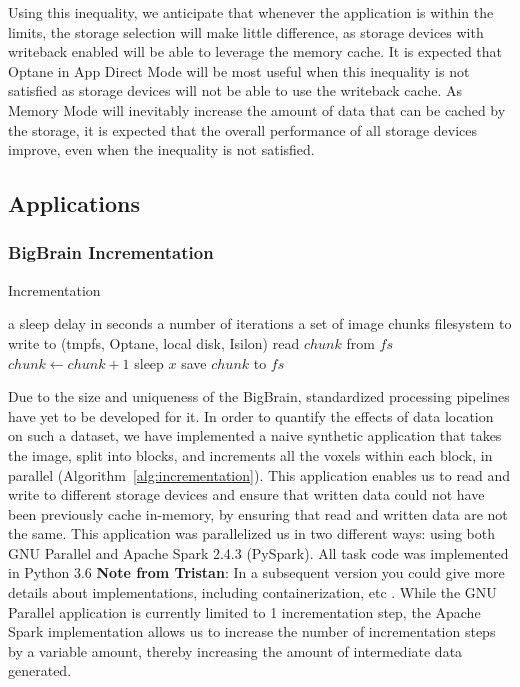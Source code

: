 \documentclass[conference]{IEEEtran}
\newcommand{\Desc}[2]{\State \makebox[2em][l]{#1}#2}
\newcommand{\bigbrain}{BigBrain\xspace}
\newcommand{\tristan}[1]{\color{orange}\textbf{Note from Tristan}:
      #1 \color{black}}
\begin{document}
Using this inequality, we anticipate that whenever the application is within the limits,
the storage selection will make little difference, as storage devices with writeback enabled 
will be able to leverage the memory cache. It is expected that Optane in App Direct Mode
will be most useful when this inequality is not satisfied as storage devices will
not be able to use the writeback cache. As Memory Mode will inevitably
increase the amount of data that can be cached by the storage, it is expected that the overall
performance of all storage devices improve, even when the inequality is not satisfied.

\subsection{Applications}
\subsubsection{ \bigbrain Incrementation}

\begin{algorithm}\caption{Incrementation}\label{alg:incrementation}
    \begin{algorithmic}[1]
    \Input
        \Desc{$x$}{a sleep delay in seconds}
        \Desc{$n$}{a number of iterations}
        \Desc{$C$}{a set of image chunks}
        \Desc{$fs$}{filesystem to write to (tmpfs, Optane, local disk, Isilon)}
    \EndInput
        \State read $chunk$ from $fs$
            \State $chunk\gets chunk+1$
            \State sleep $x$
        \EndFor
        \State save $chunk$ to $fs$
    \EndFor
    \end{algorithmic}
\end{algorithm}  

Due to the size and uniqueness of the \bigbrain, standardized processing pipelines
have yet to be developed for it. In order to quantify the effects of data location
on such a dataset, we have implemented a naive synthetic application that takes 
the image, split into blocks, and increments all the voxels within each block, in parallel (Algorithm~\ref{alg:incrementation}).
This application
enables us to read and write to different storage devices and ensure that written
data could not have been previously cache
in-memory, by ensuring that read and written data are not the same. This application
was parallelized us in two different ways: using both GNU Parallel and Apache Spark 2.4.3 (PySpark). 
All task code was implemented in Python 3.6 \tristan{In a subsequent 
version you could give more details about implementations, including containerization, etc}. While the GNU Parallel application
is currently limited to 1 incrementation step, the Apache Spark implementation allows us to increase
the number of incrementation steps by a variable amount, thereby increasing the amount of intermediate
data generated.
\end{document}
